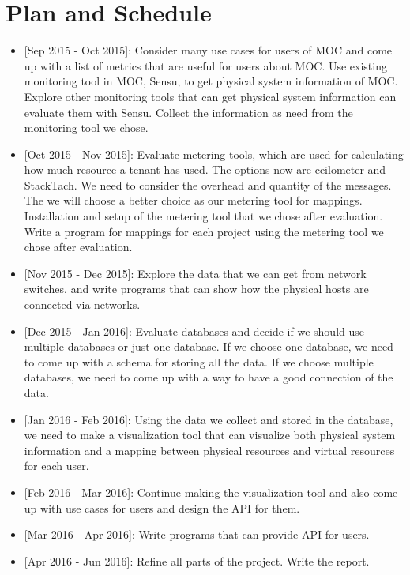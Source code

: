 \section{Plan and Schedule}
\label{sec:Plan}

\begin{itemize}
\item{[Sep 2015 - Oct 2015]:} Consider many use cases for users of MOC and come up with a list of metrics that are useful for users about MOC. Use existing monitoring tool in MOC, Sensu, to get physical system information of MOC. Explore other monitoring tools that can get physical system information can evaluate them with Sensu. Collect the information as need from the monitoring tool we chose.
\item{[Oct 2015 - Nov 2015]:} Evaluate metering tools, which are used for calculating how much resource a tenant has used. The options now are ceilometer and StackTach. We need to consider the overhead and quantity of the messages. The we will choose a better choice as our metering tool for mappings. Installation and setup of the metering tool that we chose after evaluation. Write a program for mappings for each project using the metering tool we chose after evaluation.
\item{[Nov 2015 - Dec 2015]:} Explore the data that we can get from network switches, and write programs that can show how the physical hosts are connected via networks. 
\item{[Dec 2015 - Jan 2016]:} Evaluate databases and decide if we should use multiple databases or just one database. If we choose one database, we need to come up with a schema for storing all the data. If we choose multiple databases, we need to come up with a way to have a good connection of the data. 
\item{[Jan 2016 - Feb 2016]:} Using the data we collect and stored in the database, we need to make a visualization tool that can visualize both physical system information and a mapping between physical resources and virtual resources for each user. 
\item{[Feb 2016 - Mar 2016]:} Continue making the visualization tool and also come up with use cases for users and design the API for them. 
\item{[Mar 2016 - Apr 2016]:} Write programs that can provide API for users. 
\item{[Apr 2016 - Jun 2016]:} Refine all parts of the project. Write the report.
\end{itemize}
